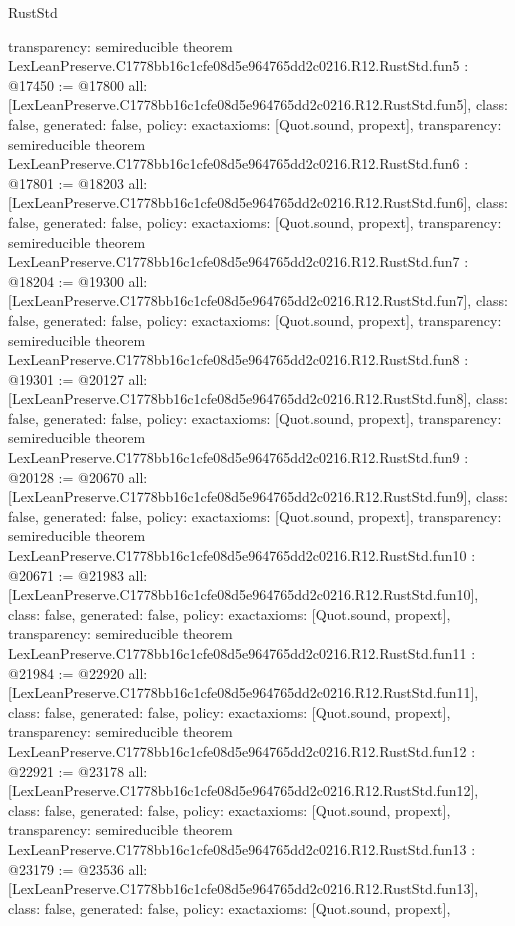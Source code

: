 \begin{lexlean}{RustStd}
\begin{coremodule}
{  transparency: semireducible
}
theorem LexLeanPreserve.C1778bb16c1cfe08d5e964765dd2c0216.R12.RustStd.fun5 : @17450 := @17800 {
  all: [LexLeanPreserve.C1778bb16c1cfe08d5e964765dd2c0216.R12.RustStd.fun5],
  class: false,
  generated: false,
  policy: exact{axioms: [Quot.sound, propext]},
  transparency: semireducible
}
theorem LexLeanPreserve.C1778bb16c1cfe08d5e964765dd2c0216.R12.RustStd.fun6 : @17801 := @18203 {
  all: [LexLeanPreserve.C1778bb16c1cfe08d5e964765dd2c0216.R12.RustStd.fun6],
  class: false,
  generated: false,
  policy: exact{axioms: [Quot.sound, propext]},
  transparency: semireducible
}
theorem LexLeanPreserve.C1778bb16c1cfe08d5e964765dd2c0216.R12.RustStd.fun7 : @18204 := @19300 {
  all: [LexLeanPreserve.C1778bb16c1cfe08d5e964765dd2c0216.R12.RustStd.fun7],
  class: false,
  generated: false,
  policy: exact{axioms: [Quot.sound, propext]},
  transparency: semireducible
}
theorem LexLeanPreserve.C1778bb16c1cfe08d5e964765dd2c0216.R12.RustStd.fun8 : @19301 := @20127 {
  all: [LexLeanPreserve.C1778bb16c1cfe08d5e964765dd2c0216.R12.RustStd.fun8],
  class: false,
  generated: false,
  policy: exact{axioms: [Quot.sound, propext]},
  transparency: semireducible
}
theorem LexLeanPreserve.C1778bb16c1cfe08d5e964765dd2c0216.R12.RustStd.fun9 : @20128 := @20670 {
  all: [LexLeanPreserve.C1778bb16c1cfe08d5e964765dd2c0216.R12.RustStd.fun9],
  class: false,
  generated: false,
  policy: exact{axioms: [Quot.sound, propext]},
  transparency: semireducible
}
theorem LexLeanPreserve.C1778bb16c1cfe08d5e964765dd2c0216.R12.RustStd.fun10 : @20671 := @21983 {
  all: [LexLeanPreserve.C1778bb16c1cfe08d5e964765dd2c0216.R12.RustStd.fun10],
  class: false,
  generated: false,
  policy: exact{axioms: [Quot.sound, propext]},
  transparency: semireducible
}
theorem LexLeanPreserve.C1778bb16c1cfe08d5e964765dd2c0216.R12.RustStd.fun11 : @21984 := @22920 {
  all: [LexLeanPreserve.C1778bb16c1cfe08d5e964765dd2c0216.R12.RustStd.fun11],
  class: false,
  generated: false,
  policy: exact{axioms: [Quot.sound, propext]},
  transparency: semireducible
}
theorem LexLeanPreserve.C1778bb16c1cfe08d5e964765dd2c0216.R12.RustStd.fun12 : @22921 := @23178 {
  all: [LexLeanPreserve.C1778bb16c1cfe08d5e964765dd2c0216.R12.RustStd.fun12],
  class: false,
  generated: false,
  policy: exact{axioms: [Quot.sound, propext]},
  transparency: semireducible
}
theorem LexLeanPreserve.C1778bb16c1cfe08d5e964765dd2c0216.R12.RustStd.fun13 : @23179 := @23536 {
  all: [LexLeanPreserve.C1778bb16c1cfe08d5e964765dd2c0216.R12.RustStd.fun13],
  class: false,
  generated: false,
  policy: exact{axioms: [Quot.sound, propext]},
}
\end{coremodule}
\end{lexlean}
